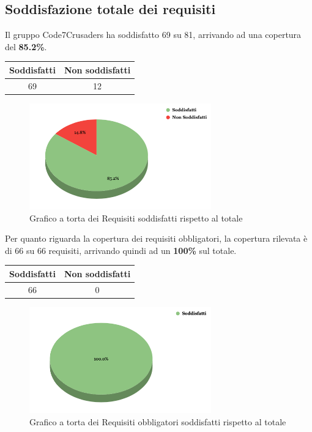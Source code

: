 \subsection{Soddisfazione totale dei requisiti}
Il gruppo Code7Crusaders ha soddisfatto 69 su 81, arrivando ad una copertura del \textbf{85.2\%}.
\begin{center}
\begin{tabular}{|c|c|}
\hline
\textbf{Soddisfatti} & \textbf{Non soddisfatti} \\
\hline
69 & 12 \\
\hline
\end{tabular}
\end{center}
\begin{figure}[H]
    \centering
    \includegraphics[width=0.7\textwidth]{img/RequisitiTotali.png}
    \caption{Grafico a torta dei Requisiti soddisfatti rispetto al totale}
\end{figure}
Per quanto riguarda la copertura dei requisiti obbligatori, la copertura rilevata è di 66 su 66 requisiti, arrivando quindi ad un \textbf{100\%} sul totale.
\begin{center}
\begin{tabular}{|c|c|}
\hline
\textbf{Soddisfatti} & \textbf{Non soddisfatti} \\
\hline
66 & 0 \\
\hline
\end{tabular}
\end{center}
\begin{figure}[H]
    \centering
    \includegraphics[width=0.7\textwidth]{img/RequisitiObbligatori.png}
    \caption{Grafico a torta dei Requisiti obbligatori soddisfatti rispetto al totale}
\end{figure}
